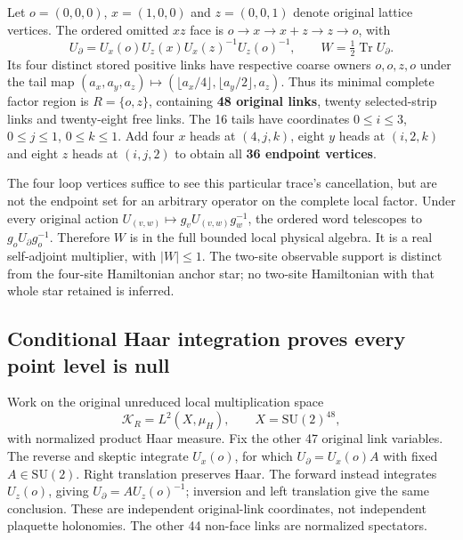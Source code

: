 Let $o=(0,0,0)$, $x=(1,0,0)$ and $z=(0,0,1)$ denote original lattice vertices. The ordered omitted $xz$ face is $o\to x\to x+z\to z\to o$, with
\begin{equation}
 U_\partial=U_x(o)U_z(x)U_x(z)^{-1}U_z(o)^{-1},
 \qquad W=\tfrac12\operatorname{Tr}U_\partial.
 \label{r28:eq:aj2-W}
\end{equation}
Its four distinct stored positive links have respective coarse owners $o,o,z,o$ under the tail map $(a_x,a_y,a_z)\mapsto(\lfloor a_x/4\rfloor,\lfloor a_y/2\rfloor,a_z)$. Thus its minimal complete factor region is $R=\{o,z\}$, containing \textbf{48 original links}, twenty selected-strip links and twenty-eight free links. The 16 tails have coordinates $0\le i\le3$, $0\le j\le1$, $0\le k\le1$. Add four $x$ heads at $(4,j,k)$, eight $y$ heads at $(i,2,k)$ and eight $z$ heads at $(i,j,2)$ to obtain all \textbf{36 endpoint vertices}.

The four loop vertices suffice to see this particular trace's cancellation, but are not the endpoint set for an arbitrary operator on the complete local factor. Under every original action $U_{(v,w)}\mapsto g_vU_{(v,w)}g_w^{-1}$, the ordered word telescopes to $g_oU_\partial g_o^{-1}$. Therefore $W$ is in the full bounded local physical algebra. It is a real self-adjoint multiplier, with $|W|\le1$. The two-site observable support is distinct from the four-site Hamiltonian anchor star; no two-site Hamiltonian with that whole star retained is inferred.

\subsection{Conditional Haar integration proves every point level is null}
Work on the original unreduced local multiplication space
\begin{equation}
 \mathcal K_R=L^2(X,\mu_H),\qquad
 X=\mathrm{SU}(2)^{48},
\end{equation}
with normalized product Haar measure. Fix the other 47 original link variables. The reverse and skeptic integrate $U_x(o)$, for which $U_\partial=U_x(o)A$ with fixed $A\in\mathrm{SU}(2)$. Right translation preserves Haar. The forward instead integrates $U_z(o)$, giving $U_\partial=A U_z(o)^{-1}$; inversion and left translation give the same conclusion. These are independent original-link coordinates, not independent plaquette holonomies. The other 44 non-face links are normalized spectators.

